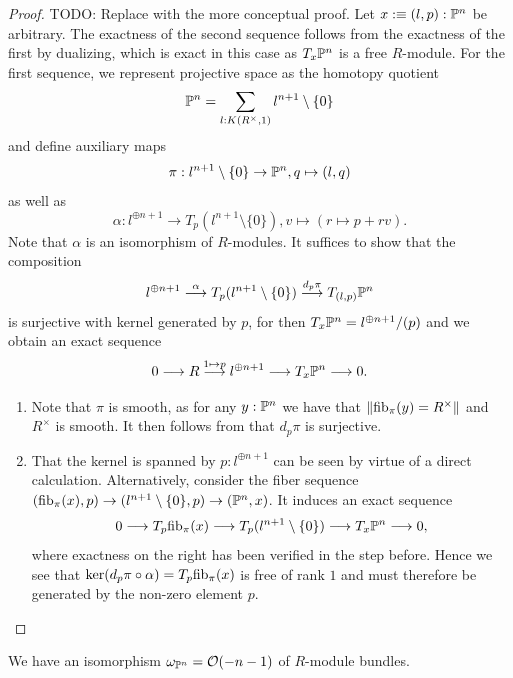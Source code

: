 \begin{proof}
  {\color{red} TODO: Replace with the more conceptual proof.}
  Let $x :\equiv (l,p) : \mathbb{P}^n$ be arbitrary.
  The exactness of the second sequence follows from the exactness of the first by dualizing,
  which is exact in this case as $T_x\mathbb{P}^n$ is a free $R$-module.
  For the first sequence, we represent projective space as the homotopy quotient
  \[
    \mathbb{P}^n = \sum_{l : K(R^\times,1)} l^{n+1}\setminus\{0\}
  \]
  and define auxiliary maps
  \[
    \pi : l^{n+1}\setminus\{0\} \to \mathbb{P}^n, q \mapsto (l,q)
  \]
  as well as
  \[
    \alpha : l^{\oplus n+1} \to T_p(l^{n+1}\setminus\{0\}), v \mapsto (r \mapsto p + rv).
  \]
  Note that $\alpha$ is an isomorphism of $R$-modules.
  It suffices to show that the composition
  \[
    l^{\oplus n+1} \overset{\alpha}{\longrightarrow}
    T_p(l^{n+1}\setminus\{0\}) \overset{d_p\pi}{\longrightarrow}
  T_{(l,p)}\mathbb{P}^n
  \]
  is surjective with kernel generated by $p$, for then $T_x\mathbb{P}^n = l^{\oplus n+1}/(p)$ and we obtain an exact sequence
  \[
    0 \longrightarrow
    R \overset{1 \mapsto p}{\longrightarrow}
    l^{\oplus n+1} \longrightarrow
    T_x\mathbb{P}^n \longrightarrow 0.
  \]
  \begin{enumerate}
    \item[i)]
    Note that $\pi$ is smooth, as for any $y : \mathbb{P}^n$ we have that $\lVert \mathrm{fib}_\pi(y) = R^\times \rVert$ and $R^\times$ is smooth.
    It then follows from \cite[Corollary 4.1.1]{diffgeo-article} that $d_p\pi$ is surjective.


    \item[ii)]
    That the kernel is spanned by $p : l^{\oplus n+1}$ can be seen by virtue of a direct calculation.
    Alternatively, consider the fiber sequence $(\mathrm{fib}_\pi(x),p) \to (l^{n+1}\setminus\{0\},p) \to (\mathbb{P}^n,x)$.
    It induces an exact sequence
    \[
      0 \longrightarrow
      T_p\mathrm{fib}_\pi(x) \longrightarrow
      T_p(l^{n+1}\setminus\{0\}) \longrightarrow
      T_x\mathbb{P}^n \longrightarrow
      0,
    \]
    where exactness on the right has been verified in the step before.
    Hence we see that $\ker(d_p\pi \circ \alpha) = T_p\mathrm{fib}_\pi(x)$ is free of rank $1$ and must therefore be generated by the non-zero element $p$.
\end{enumerate}
\end{proof}

\begin{corollary}\label{canonical-bundle-as-twist}
  We have an isomorphism $\omega_{\mathbb{P}^n} = \mathcal O(-n-1)$ of $R$-module bundles.
\end{corollary}

